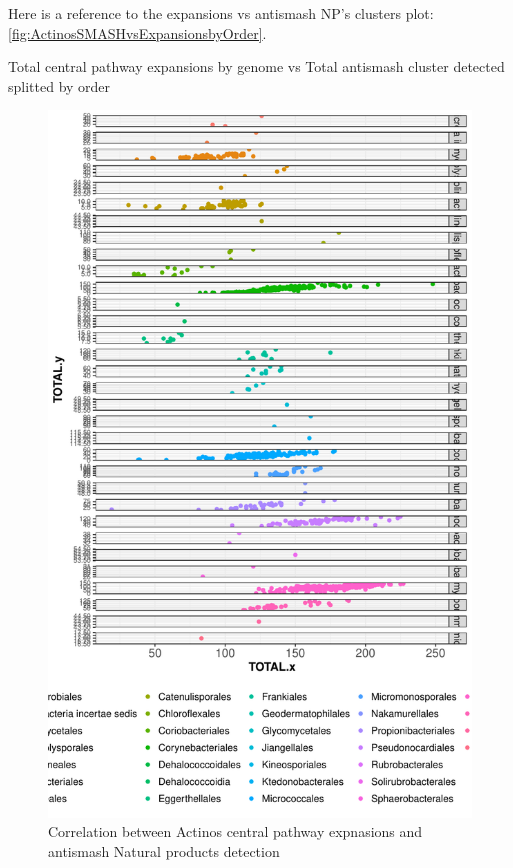 \documentclass[12pt,twoside]{reedthesis}
\begin{document}
  Here is a reference to the expansions vs antismash NP's clusters plot:
  \autoref{fig:ActinosSMASHvsExpansionsbyOrder}. \clearpage 
  
  Total central pathway expansions by genome vs Total antismash cluster
  detected splitted by order
  
  \begin{figure}[h!tbp]
  \centering
  \includegraphics[angle = 0,scale = 0.5]{chapter4/ActinosSMASHvsExpansionsbyOrderGRID.pdf}
  \caption[Correlation between Actinos central pathway expnasions and antismash Natural products detection]{\normalsize{Correlation between Actinos central pathway expnasions and antismash Natural products detection}}
  \label{fig:ActinosSMASHvsExpansionsbyOrderGRID}
  \end{figure}
  
\end{document}
